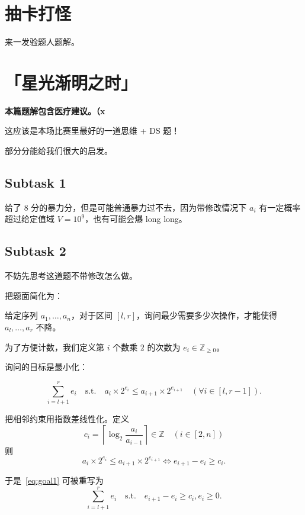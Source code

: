 \documentclass[14pt,a4paper]{article}
\begin{document}
\section{抽卡打怪}
来一发验题人题解。

\section{「星光渐明之时」}
\textbf{本篇题解包含医疗建议。（x}

这应该是本场比赛里最好的一道思维 + DS 题！

部分分能给我们很大的启发。

\subsection{Subtask 1}
给了 $8$ 分的暴力分，但是可能普通暴力过不去，因为带修改情况下 $a_i$ 有一定概率超过给定值域 $V = 10^9$，也有可能会爆 long long。

\subsection{Subtask 2}

\begin{hintbox}
不妨先思考这道题不带修改怎么做。
\end{hintbox}

把题面简化为：

给定序列 $a_1, \dots, a_n$，对于区间 $[l,r]$，询问最少需要多少次操作，才能使得 $a_l, \dots, a_r$ 不降。

为了方便计数，我们定义第 $i$ 个数乘 $2$ 的次数为 $e_i \in \mathbb{Z}_{\ge 0}$。

询问的目标是最小化：

\begin{equation}
    \sum_{i=l+1}^{r} e_i \quad \text{s.t.} \quad a_i\times 2^{e_i} \le a_{i+1}\times 2^{e_{i+1}} \quad (\forall i \in [l, r-1]).
    \label{eq:goal1}
\end{equation}


把相邻约束用指数差线性化。定义
\begin{equation}
    c_i = \left \lceil \log_2 \frac{a_{i}}{a_{i-1}} \right \rceil \in \mathbb{Z} \quad (i \in [2,n])
\end{equation}
则
\begin{equation}
    a_i\times 2^{e_i} \le a_{i+1}\times 2^{e_{i+1}} \iff e_{i+1} - e_i \ge c_i.
\end{equation}

于是~\eqref{eq:goal1} 可被重写为
\begin{equation}
    \sum_{i=l+1}^{r} e_i \quad \text{s.t.} \quad e_{i+1} - e_i \ge c_i, e_i \ge 0.
    \label{eq:goal2}
\end{equation}
\end{document}
